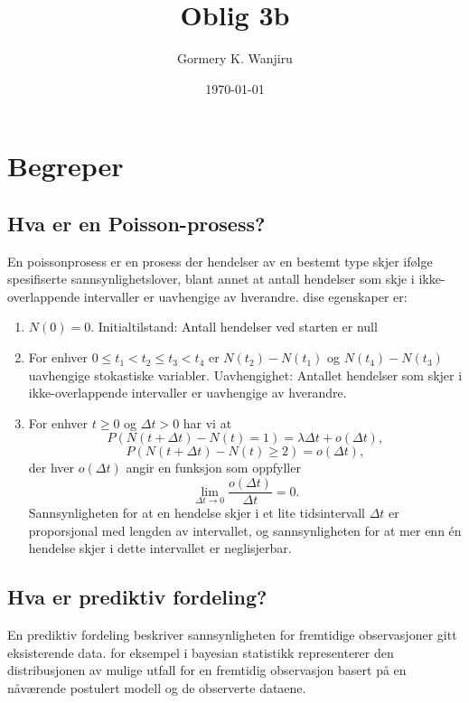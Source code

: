 \documentclass[12pt]{article}
\title{Oblig 3b}
\author{Gormery K. Wanjiru}
\date{\today}
\begin{document}
\maketitle

\newpage
\tableofcontents

\newpage
\section{Begreper}
\subsection{Hva er en Poisson-prosess?}
En poissonprosess er en prosess der hendelser av en bestemt type skjer ifølge spesifiserte sannsynlighetslover, blant annet at antall hendelser som skje i ikke-overlappende intervaller er uavhengige av hverandre.
dise egenskaper er:
\begin{enumerate}
  \item \( N(0) = 0 \). Initialtilstand: Antall hendelser ved starten er null
  \item For enhver \( 0 \leq t_1 < t_2 \leq t_3 < t_4 \) er \( N(t_2) - N(t_1) \) og \( N(t_4) - N(t_3) \) uavhengige stokastiske variabler. Uavhengighet: Antallet hendelser som skjer i ikke-overlappende intervaller er uavhengige av hverandre.

  \item For enhver \( t \geq 0 \) og \( \Delta t > 0 \) har vi at
        \[
          P(N(t + \Delta t) - N(t) = 1) = \lambda \Delta t + o(\Delta t),
        \]
        \[
          P(N(t + \Delta t) - N(t) \geq 2) = o(\Delta t),
        \]
        der hver \( o(\Delta t) \) angir en funksjon som oppfyller
        \[
          \lim_{\Delta t \to 0} \frac{o(\Delta t)}{\Delta t} = 0.
        \]
        Sannsynligheten for at en hendelse skjer i et lite tidsintervall \({\Delta t}\) er proporsjonal med lengden av intervallet, og sannsynligheten for at mer enn én hendelse skjer i dette intervallet er neglisjerbar.

\end{enumerate}


\subsection{Hva er prediktiv fordeling?}
En prediktiv fordeling beskriver sannsynligheten for fremtidige observasjoner gitt eksisterende data. for eksempel i bayesian statistikk representerer den distribusjonen av mulige utfall for en fremtidig observasjon basert på en nåværende postulert modell og de observerte dataene.
\end{document}
